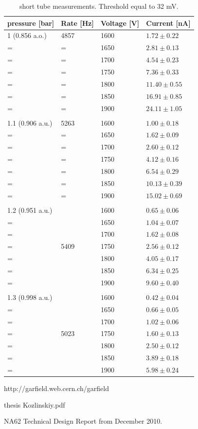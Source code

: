 \documentclass[]{article}
\begin{document}
	\begin{table}[!h]
	\centering
	\begin{tabular}{|l|l|l|l|}
		\hline
		pressure [bar] & Rate [Hz] & Voltage [V] & Current [nA]  \\
		\hline
		1 (0.856 a.o.) & 4857 & 1600 & $1.72\pm 0.22$  \\
		\hline
		= & = & 1650 & $2.81 \pm 0.13$ \\
		\hline
		= & = & 1700 & $4.54 \pm 0.23$ \\
		\hline
		= & = & 1750 & $7.36 \pm 0.33$ \\
		\hline
		= & = & 1800 & $11.40 \pm 0.55$\\
		\hline
		= & = & 1850 & $16.91 \pm 0.85$\\
		\hline
		= & = & 1900 & $24.11 \pm 1.05$\\
		\hline
		& & & \\
		\hline
		1.1 (0.906 a.u.) & 5263 & 1600 & $1.00 \pm 0.18$  \\
		\hline
		= & = &  1650 & $1.62 \pm 0.09 $ \\
		\hline
		= & = &  1700 & $2.60 \pm 0.12 $ \\
		\hline
		= & = &  1750 & $4.12 \pm 0.16 $ \\
		\hline
		= & = &  1800 & $6.54 \pm 0.29 $ \\
		\hline
		= & = &  1850 & $10.13 \pm 0.39 $ \\
		\hline
		= & = &  1900 & $15.02 \pm 0.69 $ \\
		\hline
		& & & \\
		\hline
		1.2 (0.951 a.u.) & & 1600 & $0.65 \pm 0.06 $  \\
		\hline
		= &  &  1650 & $1.04 \pm 0.07 $ \\
		\hline
		= &  &  1700 & $1.62 \pm 0.08  $ \\
		\hline
		= & 5409 &  1750 & $2.56 \pm 0.12 $ \\
		\hline
		= &  &  1800 & $4.05 \pm 0.17 $ \\
		\hline
		= &  &  1850 & $6.34 \pm 0.25 $ \\
		\hline
		= &  &  1900 & $9.60 \pm 0.40 $ \\
		\hline
		& & & \\
		\hline
		1.3 (0.998 a.u.) & & 1600 & $0.42 \pm 0.04 $  \\
		\hline
		= &  &  1650 & $0.66 \pm 0.05 $ \\
		\hline
		= &  &  1700 & $1.02 \pm 0.06 $ \\
		\hline
		= & 5023 &  1750 & $1.60 \pm 0.13$ \\
		\hline
		= &  &  1800 & $2.50 \pm 0.12 $ \\
		\hline
		= &  &  1850 & $3.89 \pm 0.18 $ \\
		\hline
		= &  &  1900 & $5.98 \pm 0.24 $ \\
		\hline
		
	\end{tabular}
	\caption{short tube measurements. Threshold equal to 32 mV. }
	\label{table:GainMeasurements}
	\end{table}		
	
		
	
\newpage
\begin{thebibliography}{00}
	 http://garfield.web.cern.ch/garfield

	  thesis Kozlinskiy.pdf 
	
	 NA62 Technical Design Report from December 2010. 
	
\end{thebibliography}
	
\end{document}
